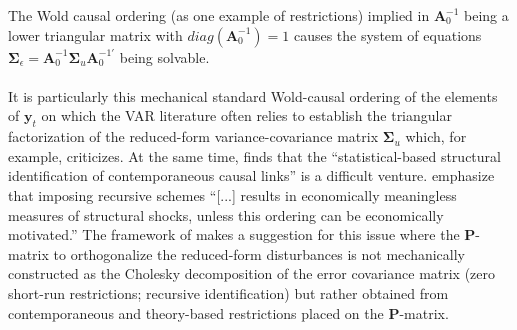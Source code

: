 \documentclass[a4paper,11pt,listof=nochaptergap,oneside,pointednumbers,bibtotoc,bigheadings,liststotoc,hidelinks]{scrbook}
\theoremstyle{mysatz}
\theoremstyle{mydefinition}
\theoremstyle{mytheorem}
\theoremstyle{mybemerkung}
\newcommand{\vect}[1]{\boldsymbol{\mathbf{#1}}}
\begin{document}
%

The Wold causal ordering (as one example of restrictions) implied in $\vect{A}_0^{-1}$ being a lower triangular matrix with $diag(\vect{A}_0^{-1}) = 1$ causes the system of equations $\vect{\Sigma}_\epsilon  = \vect{A}_0^{-1}\vect{\Sigma}_u\vect{A}_0^{-1'}$ being solvable.
\\
\\
It is particularly this mechanical standard Wold-causal ordering of the elements of $\vect{y}_t$ on which the VAR literature often relies to establish the triangular factorization of the reduced-form variance-covariance matrix $\vect{\Sigma}_u$ which, for example, \citet{jorda:05} criticizes. At the same time, \citet[p. 4]{jorda:05} finds that the ``statistical-based structural identification of contemporaneous causal links'' is a difficult venture. \citet[p. 10]{lutkepohlkilian:17} emphasize that imposing recursive schemes ``[...] results in economically meaningless measures of structural shocks, unless this ordering can be economically motivated.'' The framework of \citet{ludvigsonetal:18,ludvigsonetal:19} makes a suggestion for this issue where the $\vect{P}$-matrix to orthogonalize the reduced-form disturbances is not mechanically constructed as the Cholesky decomposition of the error covariance matrix (zero short-run restrictions; recursive identification) but rather obtained from contemporaneous and theory-based restrictions placed on the $\vect{P}$-matrix.
\end{document}
